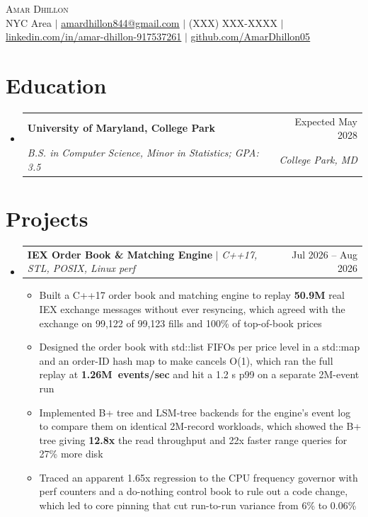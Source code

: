\documentclass[letterpaper,10pt]{article}
\makeatletter
\newcommand{\resumeItem}[1]{\item{#1}\vspace{-1pt}}
\newcommand{\resumeSubheading}[4]{%
  \vspace{-1pt}\item
  \begin{tabular*}{\textwidth}[t]{l@{\extracolsep{\fill}}r}
    \textbf{#1} & #2 \\
    \textit{#3} & \textit{#4} \\
  \end{tabular*}\vspace{-6pt}%
}
\newcommand{\resumeProjectHeading}[2]{%
  \item
  \begin{tabular*}{\textwidth}{l@{\extracolsep{\fill}}r}
    #1 & #2 \\
  \end{tabular*}\vspace{-6pt}%
}
\newcommand{\resumeSubHeadingListStart}{\begin{itemize}[leftmargin=0in, label={}, itemsep=0pt, topsep=2pt]}
\newcommand{\resumeSubHeadingListEnd}{\end{itemize}}
\newcommand{\resumeItemListStart}{\begin{itemize}[leftmargin=0.18in, itemsep=0pt, topsep=1pt, parsep=0pt]}
\newcommand{\resumeItemListEnd}{\end{itemize}\vspace{0pt}}
\makeatother
\begin{document}
\begin{center}
  {\Huge\scshape\textcolor{accent}{Amar Dhillon}} \\ \vspace{3pt}
  \footnotesize
  NYC Area $|$
  \href{mailto:amardhillon844@gmail.com}{\underline{amardhillon844@gmail.com}} $|$
  (XXX) XXX-XXXX $|$
  \href{https://linkedin.com/in/amar-dhillon-917537261}{\underline{linkedin.com/in/amar-dhillon-917537261}} $|$
  \href{https://github.com/AmarDhillon05}{\underline{github.com/AmarDhillon05}}
\end{center}
\vspace{-6pt}

\section{Education}
\resumeSubHeadingListStart
  \resumeSubheading
    {University of Maryland, College Park}{Expected May 2028}
    {B.S. in Computer Science, Minor in Statistics; GPA: 3.5}{College Park, MD}
\resumeSubHeadingListEnd

\section{Projects}
\resumeSubHeadingListStart
  \resumeProjectHeading
    {\textbf{IEX Order Book \& Matching Engine} $|$ \textit{C++17, STL, POSIX, Linux perf}}{Jul 2026 -- Aug 2026}
  \resumeItemListStart
    \resumeItem{Built a C++17 order book and matching engine to replay \textbf{50.9M} real IEX exchange messages without ever resyncing, which agreed with the exchange on 99,122 of 99,123 fills and 100\% of top-of-book prices}
    \resumeItem{Designed the order book with std::list FIFOs per price level in a std::map and an order-ID hash map to make cancels O(1), which ran the full replay at \mbox{\textbf{1.26M events/sec}} and hit a 1.2 \textmu{}s p99 on a separate 2M-event run}
    \resumeItem{Implemented B+ tree and LSM-tree backends for the engine's event log to compare them on identical 2M-record workloads, which showed the B+ tree giving \textbf{12.8x} the read throughput and 22x faster range queries for 27\% more disk}
    \resumeItem{Traced an apparent 1.65x regression to the CPU frequency governor with perf counters and a do-nothing control book to rule out a code change, which led to core pinning that cut run-to-run variance from 6\% to 0.06\%}
  \resumeItemListEnd
\resumeSubHeadingListEnd
\end{document}
